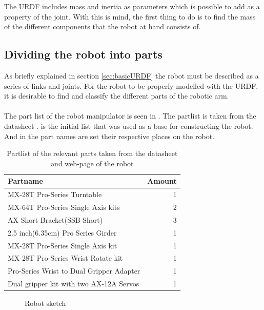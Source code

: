 The URDF includes mass and inertia as parameters which is possible to add as a property of the joint. With this is mind, the first thing to do is to find the mass of the different components that the robot at hand consists of. 

\subsection{Dividing the robot into parts}
As briefly explained in section \ref{sec:basicURDF} the robot must be described as a series of links and joints. For the robot to be properly modelled with the URDF, it is desirable to find and classify the different parts of the robotic arm.\\\\
The part list of the robot manipulator is seen in . The partlist is taken from the datasheet \cite{Crustcrawler}.  is the initial list that was used as a base for constructing the robot. And in  the part names are set their respective places on the robot. 

\begin{table}[htpb]%
\centering
\caption{Partlist of the relevant parts taken from the datasheet and web-page of the robot}
\label{table:partlist}
    \begin{tabular}{ l r}
        \toprule
        Partname  & Amount \\
        \midrule
        MX-28T Pro-Series Turntable & 1\\
        MX-64T Pro-Series Single Axis kits& 2\\
        AX Short Bracket(SSB-Short) & 3\\
        2.5 inch(6.35cm) Pro Series Girder & 1 \\
        MX-28T Pro-Series Single Axis kit & 1 \\
        MX-28T Pro-Series Wrist Rotate kit & 1\\
        Pro-Series Wrist to Dual Gripper Adapter & 1\\
        Dual gripper kit with two AX-12A Servos& 1\\
               \bottomrule
    \end{tabular}
\end{table}



\begin{figure}[htbp]
  \centering
  
  \caption{Robot sketch}
  \label{fig:utgangspunkt}
\end{figure}




